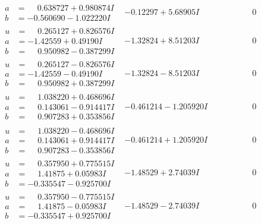 \documentclass[1p]{elsarticle_modified}
\theoremstyle{definition}
\begin{document}
$$\begin{array}{c|c|c}
\begin{aligned}
a &= \phantom{-}0.638727 + 0.980874 I \\
b &= -0.560690 - 1.022220 I\end{aligned}
 & -0.12297 + 5.68905 I & \phantom{-0.000000 } 0 \\ \hline\begin{aligned}
u &= \phantom{-}0.265127 + 0.826576 I \\
a &= -1.42559 + 0.49190 I \\
b &= \phantom{-}0.950982 - 0.387299 I\end{aligned}
 & -1.32824 + 8.51203 I & \phantom{-0.000000 } 0 \\ \hline\begin{aligned}
u &= \phantom{-}0.265127 - 0.826576 I \\
a &= -1.42559 - 0.49190 I \\
b &= \phantom{-}0.950982 + 0.387299 I\end{aligned}
 & -1.32824 - 8.51203 I & \phantom{-0.000000 } 0 \\ \hline\begin{aligned}
u &= \phantom{-}1.038220 + 0.468696 I \\
a &= \phantom{-}0.143061 - 0.914417 I \\
b &= \phantom{-}0.907283 + 0.353856 I\end{aligned}
 & -0.461214 - 1.205920 I & \phantom{-0.000000 } 0 \\ \hline\begin{aligned}
u &= \phantom{-}1.038220 - 0.468696 I \\
a &= \phantom{-}0.143061 + 0.914417 I \\
b &= \phantom{-}0.907283 - 0.353856 I\end{aligned}
 & -0.461214 + 1.205920 I & \phantom{-0.000000 } 0 \\ \hline\begin{aligned}
u &= \phantom{-}0.357950 + 0.775515 I \\
a &= \phantom{-}1.41875 + 0.05983 I \\
b &= -0.335547 - 0.925700 I\end{aligned}
 & -1.48529 + 2.74039 I & \phantom{-0.000000 } 0 \\ \hline\begin{aligned}
u &= \phantom{-}0.357950 - 0.775515 I \\
a &= \phantom{-}1.41875 - 0.05983 I \\
b &= -0.335547 + 0.925700 I\end{aligned}
 & -1.48529 - 2.74039 I & \phantom{-0.000000 } 0 \\ \hline\begin{aligned}

\end{aligned}
\end{array}$$
\end{document}
